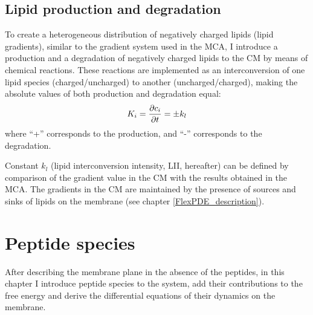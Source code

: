 \subsection{Lipid production and degradation}

\label{source_terms}

To create a heterogeneous distribution of negatively charged lipids (lipid gradients), similar to the gradient system used in the MCA, I introduce a production and a degradation of negatively charged lipids to the CM by means of chemical reactions. These reactions are implemented as an interconversion of one lipid species (charged/uncharged) to another (uncharged/charged), making the absolute values of both production and degradation equal:
\begin{equation}
\label{krc1}
 K_i=\frac{\partial c_i}{\partial t}=  \pm k_l \\
\end{equation}
where ``+'' corresponds to the production, and ``-'' corresponds to the degradation.

Constant $k_l$ (lipid interconversion intensity, LII, hereafter) can be defined by comparison of the gradient value in the CM with the results obtained in the MCA. The gradients in the CM are maintained by the presence of sources and sinks of lipids on the membrane (see chapter \ref{FlexPDE_description}).

\section{Peptide species}


After describing the membrane plane in the absence of the peptides, in this chapter I introduce peptide species to the system, add their contributions to the free energy and derive the differential equations of their dynamics on the membrane.

